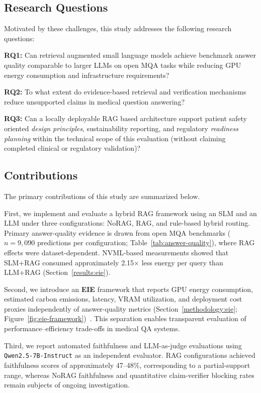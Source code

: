 \subsection{Research Questions}

Motivated by these challenges, this study addresses the following research questions:

\textbf{RQ1:} Can retrieval augmented small language models achieve benchmark answer quality comparable to larger LLMs on open MQA tasks while reducing GPU energy consumption and infrastructure requirements?

\textbf{RQ2:} To what extent do evidence-based retrieval and verification mechanisms reduce unsupported claims in medical question answering?

\textbf{RQ3:} Can a locally deployable RAG based architecture support patient safety oriented \emph{design principles}, sustainability reporting, and regulatory \emph{readiness planning} within the technical scope of this evaluation (without claiming completed clinical or regulatory validation)?

\subsection{Contributions}

The primary contributions of this study are summarized below.

First, we implement and evaluate a hybrid RAG framework using an SLM  and an LLM  under three configurations: NoRAG, RAG, and rule-based hybrid routing. Primary answer-quality evidence is drawn from open MQA benchmarks ($n{=}9{,}090$ predictions per configuration; Table~\ref{tab:answer-quality}), where RAG effects were dataset-dependent. NVML-based measurements showed that SLM+RAG consumed approximately 2.15$\times$ less energy per query than LLM+RAG (Section~\ref{results:eie}).

Second, we introduce an \textbf{EIE} framework that reports GPU energy consumption, estimated carbon emissions, latency, VRAM utilization, and deployment cost proxies independently of answer-quality metrics (Section~\ref{methodology:eie}; Figure~\ref{fig:eie-framework})~\cite{ren2024reconciling,dauner2025ai,patterson2021carbon,strubell2019energy}. This separation enables transparent evaluation of performance--efficiency trade-offs in medical QA systems.

Third, we report automated faithfulness and LLM-as-judge evaluations using \texttt{Qwen2.5-7B-Instruct} as an independent evaluator. RAG configurations achieved faithfulness scores of approximately 47--48\%, corresponding to a partial-support range, whereas NoRAG faithfulness and quantitative claim-verifier blocking rates remain subjects of ongoing investigation.


